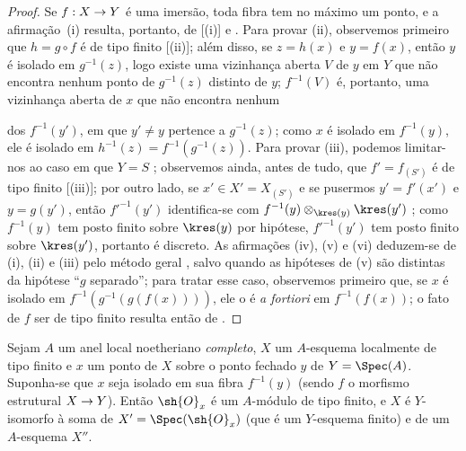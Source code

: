 \documentclass[oneside,10pt]{amsart}
\makeatletter
\newcommand{\ega@arrow}[2]{\mathchoice{#1}{#2}{#2}{#2}}
\renewcommand{\to}{\ega@arrow{\longrightarrow}{\rightarrow}}
\newcommand{\oldpage}[2][]{\marginnote{\normalfont\footnotesize\textbf{#1}~|~#2}\ignorespaces}
\let\EGAOriginalLabel\label
\renewcommand{\label}[1]{\phantomsection\EGAOriginalLabel{#1}}
\makeatother
\begin{document}
\begin{proof}
Se $f:X\to Y$ é uma imersão, toda fibra tem no máximo um ponto, e a afirmação~(i) resulta, portanto, de [(i)] e .
Para provar (ii), observemos primeiro que $h=g\circ f$ é de tipo finito [(ii)];
além disso, se $z=h(x)$ e $y=f(x)$, então $y$ é isolado em $g^{-1}(z)$, logo existe uma vizinhança aberta $V$ de $y$ em $Y$ que não encontra nenhum ponto de $g^{-1}(z)$ distinto de $y$;
$f^{-1}(V)$ é, portanto, uma vizinhança aberta de $x$ que não encontra nenhum

\oldpage[II]{116}
dos $f^{-1}(y')$, em que $y'\neq y$ pertence a $g^{-1}(z)$;
como $x$ é isolado em $f^{-1}(y)$, ele é isolado em $h^{-1}(z)=f^{-1}(g^{-1}(z))$.
Para provar (iii), podemos limitar-nos ao caso em que $Y=S$ ;
observemos ainda, antes de tudo, que $f'=f_{(S')}$ é de tipo finito [(iii)];
por outro lado, se $x'\in X'=X_{(S')}$ e se pusermos $y'=f'(x')$ e $y=g(y')$, então ${f'}^{-1}(y')$ identifica-se com $f^{-1}(y)\otimes_{\kres(y)}\kres(y')$ ;
como $f^{-1}(y)$ tem posto finito sobre $\kres(y)$ por hipótese, ${f'}^{-1}(y')$ tem posto finito sobre $\kres(y')$, portanto é discreto.
As afirmações (iv), (v) e (vi) deduzem-se de (i), (ii) e (iii) pelo método geral , salvo quando as hipóteses de (v) são distintas da hipótese ``$g$ separado'';
para tratar esse caso, observemos primeiro que, se $x$ é isolado em $f^{-1}(g^{-1}(g(f(x))))$, ele o é \emph{a fortiori} em $f^{-1}(f(x))$;
o fato de $f$ ser de tipo finito resulta então de .
\end{proof}

\begin{proposition}[6.2.5]
\label{II.6.2.5}
Sejam $A$ um anel local noetheriano \emph{completo}, $X$ um $A$-esquema localmente de tipo finito e $x$ um ponto de $X$ sobre o ponto fechado $y$ de $Y=\Spec(A)$.
Suponha-se que $x$ seja isolado em sua fibra $f^{-1}(y)$ (sendo $f$ o morfismo estrutural $X\to Y$).
Então $\sh{O}_x$ é um $A$-módulo de tipo finito, e $X$ é $Y$-isomorfo à soma  de $X'=\Spec(\sh{O}_x)$ (que é um $Y$-esquema finito) e de um $A$-esquema $X''$.
\end{proposition}
\end{document}
